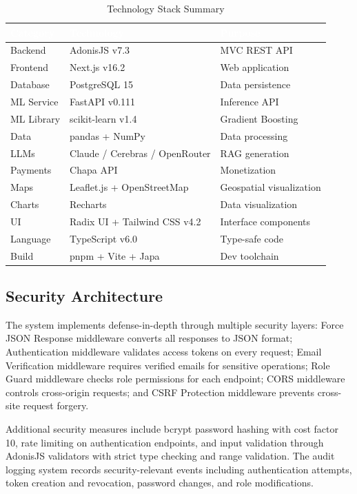 \documentclass[12pt,a4paper,oneside]{report}
\begin{document}
\begin{table}[H]
\centering
\caption{Technology Stack Summary}
\label{tab:tech-stack}
\renewcommand{\arraystretch}{1.4}
\begin{tabularx}{\textwidth}{XXl}
\toprule
\rowcolor{headerblue}
\textcolor{white}{\textbf{Category}} & \textcolor{white}{\textbf{Technology}} & \textcolor{white}{\textbf{Purpose}} \\
\midrule
Backend & AdonisJS v7.3 & MVC REST API \\
\rowcolor{rowalt}
Frontend & Next.js v16.2 & Web application \\
Database & PostgreSQL 15 & Data persistence \\
\rowcolor{rowalt}
ML Service & FastAPI v0.111 & Inference API \\
ML Library & scikit-learn v1.4 & Gradient Boosting \\
\rowcolor{rowalt}
Data & pandas + NumPy & Data processing \\
LLMs & Claude / Cerebras / OpenRouter & RAG generation \\
\rowcolor{rowalt}
Payments & Chapa API & Monetization \\
Maps & Leaflet.js + OpenStreetMap & Geospatial visualization \\
\rowcolor{rowalt}
Charts & Recharts & Data visualization \\
UI & Radix UI + Tailwind CSS v4.2 & Interface components \\
\rowcolor{rowalt}
Language & TypeScript v6.0 & Type-safe code \\
Build & pnpm + Vite + Japa & Dev toolchain \\
\bottomrule
\end{tabularx}
\end{table}

\subsection{Security Architecture}
The system implements defense-in-depth through multiple security layers: Force JSON Response middleware converts all responses to JSON format; Authentication middleware validates access tokens on every request; Email Verification middleware requires verified emails for sensitive operations; Role Guard middleware checks role permissions for each endpoint; CORS middleware controls cross-origin requests; and CSRF Protection middleware prevents cross-site request forgery.

Additional security measures include bcrypt password hashing with cost factor 10, rate limiting on authentication endpoints, and input validation through AdonisJS validators with strict type checking and range validation. The audit logging system records security-relevant events including authentication attempts, token creation and revocation, password changes, and role modifications.
\end{document}
